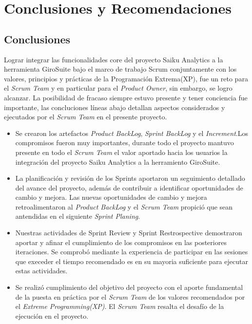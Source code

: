 \chapter{Conclusiones y Recomendaciones} \label{chapter:IV}
\begin{spacing}{1.5}
\section{Conclusiones}
Lograr integrar las funcionalidades core del proyecto Saiku Analytics a la herramienta GiroSuite bajo el marco de trabajo Scrum conjuntamente con los valores, principios y pr\'{a}cticas de la Programaci\'{o}n Extrema(XP), fue un reto para el \textit{Scrum Team} y en particular para el \textit{Product Owner}, sin embargo, se logro alcanzar. La posibilidad de fracaso siempre estuvo presente y tener conciencia fue importante, las concluciones l\'{i}neas abajo detallan aspectos considerados y ejecutados por el \textit{Scrum Team} en el presente proyecto.
\begin{itemize}
	
	\item Se crearon los artefactos \textit{Product BackLog}, \textit{Sprint BackLog} y el \textit{Increment}.Los compromisos fueron muy importantes, durante todo el proyecto mantuvo presente en todo el \textit{Scrum Team} el valor aportado hacia los usuarios la integraci\'{o}n del proyecto Saiku Analytics a la herramiento GiroSuite.
	
	\item La planificaci\'{o}n y revisi\'{o}n de los Sprints aportaron un seguimiento detallado del avance del proyecto, adem\'{a}s de contribuir a identificar oportunidades de cambio y mejora. Las nuevas oportunidades de cambio y mejora retroalimentaron al \textit{Product BackLog} y el \textit{Scrum Team} propici\'{o} que sean antendidas en el siguiente \textit{Sprint Planing}.
	
	\item Nuestras actividades de Sprint Review y Sprint Restrospective demostraron aportar y afinar el cumplimiento de los compromisos en las posteriores iteraciones. Se comprob\'{o} mediante la experiencia de participar en las sesiones que  execeder el tiempo recomendado es en su mayoria suficiente para ejecutar estas actividades.
	
	\item Se realiz\'{o} cumplimiento del objetivo del proyecto con el aporte fundamental de la puesta en pr\'{a}ctica por el \textit{Scrum Team} de los valores recomendados por el \textit{Extreme Programming(XP)}. El \textit{Scrum Team} resalta el desaf\'{i}o de la ejecuci\'{o}n en el proyecto.
	

\end{itemize}
\end{spacing}

